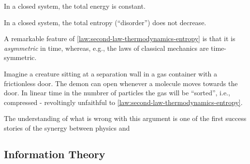 \begin{law}\label{law:first-law-thermodynamics-energy}
In a closed system, the total energy is constant.
\end{law}
\begin{law}\label{law:second-law-thermodynamics-entropy}
In a closed system, the total entropy (``disorder'') does not decrease.
\end{law}
A remarkable feature of \autoref{law:second-law-thermodynamics-entropy} is that it is \emph{asymmetric} in time, whereas, e.g., the laws of classical mechanics are time-symmetric.



\begin{paradox}\label{par:maxwells-demon}
Imagine a creature sitting at a separation wall  in a gas container with a frictionless door.
The demon can open whenever a molecule moves towards the door.
In linear time in the numbrer of particles the gas will be ``sorted'', i.e., compressed - revoltingly unfaithful to \autoref{law:second-law-thermodynamics-entropy}.
\end{paradox}

The understanding of what is wrong with this argument is one of the first success stories of the synergy between physics and

\subsection{Information Theory}



